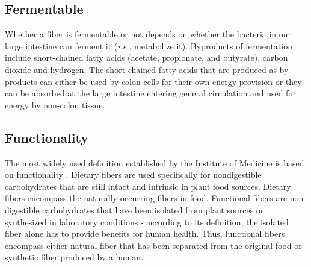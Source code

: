 \documentclass{tufte-handout}
\begin{document}
\subsection{Fermentable}
Whether a fiber is fermentable or not depends on whether the bacteria in our large intestine can ferment it (\textit{i.e.}, metabolize it). Byproducts of fermentation include short-chained fatty acids (acetate, propionate, and butyrate), carbon dioxide and hydrogen. The short chained fatty acids that are produced as by-products can either be used by colon cells for their own energy provision or they can be absorbed at the large intestine entering general circulation and used for energy by non-colon tissue.

\subsection{Functionality}
The most widely used definition established by the Institute of Medicine is based on functionality \citep{InstituteofMedicine2005}. Dietary fibers are used specifically for nondigestible carbohydrates that are still intact and intrinsic in plant food sources. Dietary fibers encompass the naturally occurring fibers in food. Functional fibers are non-digestible carbohydrates that have been isolated from plant sources or synthesized in laboratory conditions - according to its definition, the isolated fiber alone has to provide benefits for human health. Thus, functional fibers encompass either natural fiber that has been separated from the original food or synthetic fiber produced by a human.
\end{document}
